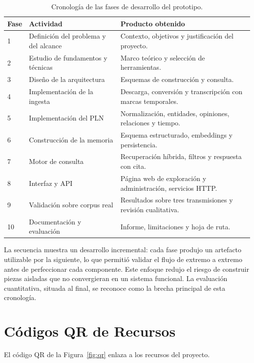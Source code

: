 \documentclass[12pt,a4paper]{article}
\begin{document}
\begin{table}[h]
\centering
\small
\begin{tabular}{@{}p{1.2cm}p{6.2cm}p{6.8cm}@{}}
\toprule
\textbf{Fase} & \textbf{Actividad} & \textbf{Producto obtenido} \\
\midrule
1 & Definición del problema y del alcance & Contexto, objetivos y justificación del proyecto. \\
2 & Estudio de fundamentos y técnicas & Marco teórico y selección de herramientas. \\
3 & Diseño de la arquitectura & Esquemas de construcción y consulta. \\
4 & Implementación de la ingesta & Descarga, conversión y transcripción con marcas temporales. \\
5 & Implementación del PLN & Normalización, entidades, opiniones, relaciones y tiempo. \\
6 & Construcción de la memoria & Esquema estructurado, embeddings y persistencia. \\
7 & Motor de consulta & Recuperación híbrida, filtros y respuesta con cita. \\
8 & Interfaz y API & Página web de exploración y administración, servicios HTTP. \\
9 & Validación sobre corpus real & Resultados sobre tres transmisiones y revisión cualitativa. \\
10 & Documentación y evaluación & Informe, limitaciones y hoja de ruta. \\
\bottomrule
\end{tabular}
\caption{Cronología de las fases de desarrollo del prototipo.}
\label{tab:cronologia}
\end{table}

La secuencia muestra un desarrollo incremental: cada fase produjo un artefacto utilizable por la siguiente, lo que permitió validar el flujo de extremo a extremo antes de perfeccionar cada componente. Este enfoque redujo el riesgo de construir piezas aisladas que no convergieran en un sistema funcional. La evaluación cuantitativa, situada al final, se reconoce como la brecha principal de esta cronología.


\section{Códigos QR de Recursos}
\label{anexo:qr}

El código QR de la Figura~\ref{fig:qr} enlaza a los recursos del proyecto.
\end{document}
